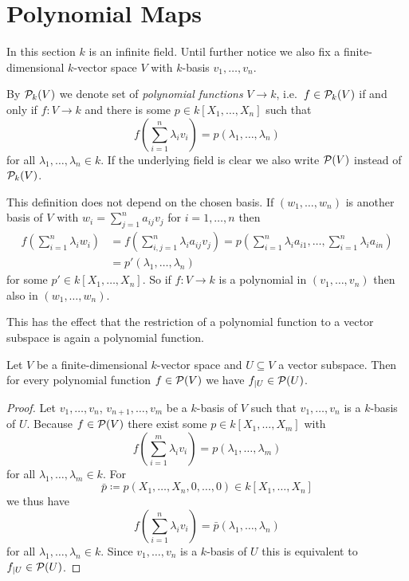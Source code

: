 




\section{Polynomial Maps}


In this section $k$ is an infinite field.
Until further notice we also fix a finite-dimensional $k$-vector space $V$ with $k$-basis $v_1, \dotsc, v_n$.


\begin{definition}
  By $\mathcal{P}_k(V)$ we denote set of \emph{polynomial functions} $V \to k$, i.e.\ $f \in \mathcal{P}_k(V)$ if and only if $f \colon V \to k$ and there is some $p \in k[X_1, \dotsc, X_n]$ such that
  \[
      f\left( \sum_{i=1}^n \lambda_i v_i \right)
    = p(\lambda_1, \dotsc, \lambda_n)
  \]
  for all $\lambda_1, \dotsc, \lambda_n \in k$.
  If the underlying field is clear we also write $\mathcal{P}(V)$ instead of $\mathcal{P}_k(V)$.
\end{definition}


This definition does not depend on the chosen basis.
If $(w_1, \dotsc, w_n)$ is another basis of $V$ with $w_i = \sum_{j=1}^n a_{ij} v_j$ for $i = 1, \dotsc, n$ then
\begin{align*}
      f\left( \sum_{i=1}^n \lambda_i w_i \right)
  &=  f\left( \sum_{i,j=1}^n \lambda_i a_{ij} v_j \right)
   =  p\left( \sum_{i=1}^n \lambda_i a_{i1}, \dotsc, \sum_{i=1}^n \lambda_{i} a_{in} \right)  \\
  &=  p'(\lambda_1, \dotsc, \lambda_n)
\end{align*}
for some $p' \in k[X_1, \dotsc, X_n]$.
So if $f \colon V \to k$ is a polynomial in $(v_1, \dotsc, v_n)$ then also in $(w_1, \dotsc, w_n)$.

This has the effect that the restriction of a polynomial function to a vector subspace is again a polynomial function.

\begin{lemma}
  Let $V$ be a finite-dimensional $k$-vector space and $U \subseteq V$ a vector subspace.
  Then for every polynomial function $f \in \mathcal{P}(V)$ we have $f_{|U} \in \mathcal{P}(U)$.
\end{lemma}
\begin{proof}
  Let $v_1, \dotsc, v_n$, $v_{n+1}, \dotsc, v_m$ be a $k$-basis of $V$ such that $v_1, \dotsc, v_n$ is a $k$-basis of $U$.
  Because $f \in \mathcal{P}(V)$ there exist some $p \in k[X_1, \dotsc, X_m]$ with
  \[
      f\left( \sum_{i=1}^m \lambda_i v_i \right)
    = p(\lambda_1, \dotsc, \lambda_m)
  \]
  for all $\lambda_1, \dotsc, \lambda_m \in k$. For
  \[
              \bar{p}
    \coloneqq p(X_1, \dotsc, X_n, 0, \dotsc, 0)
    \in       k[X_1, \dotsc, X_n]
  \]
  we thus have
  \[
      f\left( \sum_{i=1}^n \lambda_i v_i \right)
    = \bar{p}(\lambda_1, \dotsc, \lambda_n)
  \]
  for all $\lambda_1, \dotsc, \lambda_n \in k$.
  Since $v_1, \dotsc, v_n$ is a $k$-basis of $U$ this is equivalent to $f_{|U} \in \mathcal{P}(U)$.
\end{proof}


